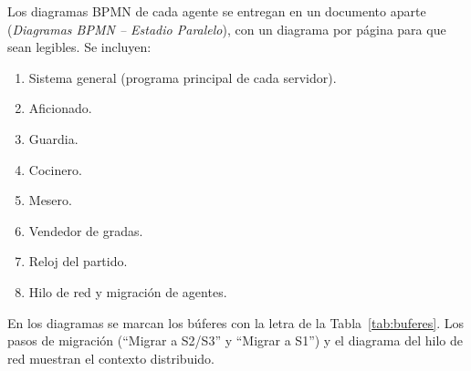 \documentclass[11pt,letterpaper]{article}
\newcommand{\proyecto}{Estadio Paralelo}
\begin{document}
Los diagramas BPMN de cada agente se entregan en un documento aparte (\emph{Diagramas BPMN -- \proyecto}), con un diagrama por página para que sean legibles. Se incluyen:
\begin{enumerate}[label=\arabic*.]
  \item Sistema general (programa principal de cada servidor).
  \item Aficionado.
  \item Guardia.
  \item Cocinero.
  \item Mesero.
  \item Vendedor de gradas.
  \item Reloj del partido.
  \item Hilo de red y migración de agentes.
\end{enumerate}
En los diagramas se marcan los búferes con la letra de la Tabla~\ref{tab:buferes}. Los pasos de migración (``Migrar a S2/S3'' y ``Migrar a S1'') y el diagrama del hilo de red muestran el contexto distribuido.
\end{document}
